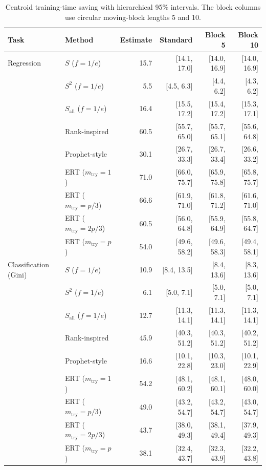 \begin{table}[t]
\centering
\caption{Centroid training-time saving with hierarchical 95\% intervals. The block columns use circular moving-block lengths 5 and 10.}
\label{tab:inference-timing-sensitivity}
\scriptsize
\setlength{\tabcolsep}{4pt}
\begin{tabular}{@{}llrrrr@{}}
\toprule
Task & Method & Estimate & Standard & Block 5 & Block 10 \\
\midrule
Regression & $S$ ($f=1/e$) & 15.7 & [14.1, 17.0] & [14.0, 16.9] & [14.0, 16.9] \\
 & $S^{2}$ ($f=1/e$) & 5.5 & [4.5, 6.3] & [4.4, 6.2] & [4.3, 6.2] \\
 & $S_{\mathrm{all}}$ ($f=1/e$) & 16.4 & [15.5, 17.2] & [15.4, 17.2] & [15.3, 17.1] \\
 & Rank-inspired & 60.5 & [55.7, 65.0] & [55.7, 65.1] & [55.6, 64.8] \\
 & Prophet-style & 30.1 & [26.7, 33.3] & [26.7, 33.4] & [26.6, 33.2] \\
 & ERT ($m_{\mathrm{try}}=1$) & 71.0 & [66.0, 75.7] & [65.9, 75.8] & [65.8, 75.7] \\
 & ERT ($m_{\mathrm{try}}=p/3$) & 66.6 & [61.9, 71.0] & [61.8, 71.2] & [61.6, 71.0] \\
 & ERT ($m_{\mathrm{try}}=2p/3$) & 60.5 & [56.0, 64.8] & [55.9, 64.9] & [55.8, 64.7] \\
 & ERT ($m_{\mathrm{try}}=p$) & 54.0 & [49.6, 58.2] & [49.6, 58.3] & [49.4, 58.1] \\
\addlinespace
Classification (Gini) & $S$ ($f=1/e$) & 10.9 & [8.4, 13.5] & [8.4, 13.6] & [8.3, 13.6] \\
 & $S^{2}$ ($f=1/e$) & 6.1 & [5.0, 7.1] & [5.0, 7.1] & [5.0, 7.1] \\
 & $S_{\mathrm{all}}$ ($f=1/e$) & 12.7 & [11.3, 14.1] & [11.3, 14.1] & [11.3, 14.1] \\
 & Rank-inspired & 45.9 & [40.3, 51.2] & [40.3, 51.2] & [40.2, 51.2] \\
 & Prophet-style & 16.6 & [10.1, 22.8] & [10.3, 23.0] & [10.1, 22.9] \\
 & ERT ($m_{\mathrm{try}}=1$) & 54.2 & [48.1, 60.2] & [48.1, 60.1] & [48.0, 60.0] \\
 & ERT ($m_{\mathrm{try}}=p/3$) & 49.0 & [43.2, 54.7] & [43.2, 54.7] & [43.0, 54.7] \\
 & ERT ($m_{\mathrm{try}}=2p/3$) & 43.7 & [38.0, 49.3] & [38.1, 49.4] & [37.9, 49.3] \\
 & ERT ($m_{\mathrm{try}}=p$) & 38.1 & [32.4, 43.7] & [32.3, 43.9] & [32.2, 43.8] \\

\end{tabular}
\end{table}

